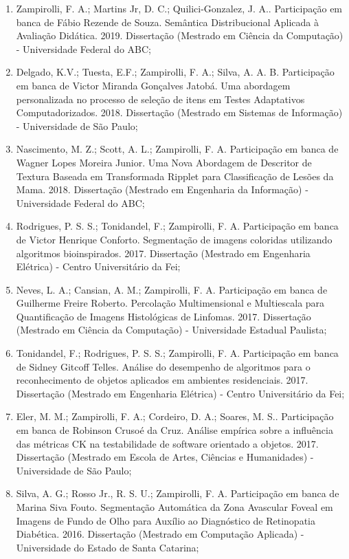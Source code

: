 \begin{enumerate}
    \item Zampirolli, F. A.; Martins Jr, D. C.; Quilici-Gonzalez, J. A.. Participação em banca de Fábio Rezende de Souza. Semântica Distribucional Aplicada à Avaliação Didática. 2019. Dissertação (Mestrado em Ciência da Computação) - Universidade Federal do ABC;
    \item Delgado, K.V.; Tuesta, E.F.; Zampirolli, F. A.; Silva, A. A. B. Participação em banca de Victor Miranda Gonçalves Jatobá. Uma abordagem personalizada no processo de seleção de itens em Testes Adaptativos Computadorizados. 2018. Dissertação (Mestrado em Sistemas de Informação) - Universidade de São Paulo;
    \item Nascimento, M. Z.; Scott, A. L.;  Zampirolli, F. A. Participação em banca de Wagner Lopes Moreira Junior. Uma Nova Abordagem de Descritor de Textura Baseada em Transformada Ripplet para Classificação de Lesões da Mama. 2018. Dissertação (Mestrado em Engenharia da Informação) - Universidade Federal do ABC;
    \item Rodrigues, P. S. S.; Tonidandel, F.; Zampirolli, F. A. Participação em banca de Victor Henrique Conforto. Segmentação de imagens coloridas utilizando algoritmos bioinspirados. 2017. Dissertação (Mestrado em Engenharia Elétrica) - Centro Universitário da Fei;
    \item Neves, L. A.; Cansian, A. M.; Zampirolli, F. A. Participação em banca de Guilherme Freire Roberto. Percolação Multimensional e Multiescala para Quantificação de Imagens Histológicas de Linfomas. 2017. Dissertação (Mestrado em Ciência da Computação) - Universidade Estadual Paulista;
    \item Tonidandel, F.; Rodrigues, P. S. S.; Zampirolli, F. A. Participação em banca de Sidney Gitcoff Telles. Análise do desempenho de algoritmos para o reconhecimento de objetos aplicados em ambientes residenciais. 2017. Dissertação (Mestrado em Engenharia Elétrica) - Centro Universitário da Fei;
    \item Eler, M. M.; Zampirolli, F. A.; Cordeiro, D. A.; Soares, M. S.. Participação em banca de Robinson Crusoé da Cruz. Análise empírica sobre a influência das métricas CK na testabilidade de software orientado a objetos. 2017. Dissertação (Mestrado em Escola de Artes, Ciências e Humanidades) - Universidade de São Paulo;
    \item Silva, A. G.; Rosso Jr., R. S. U.; Zampirolli, F. A. Participação em banca de Marina Siva Fouto. Segmentação Automática da Zona Avascular Foveal em Imagens de Fundo de Olho para Auxílio ao Diagnóstico de Retinopatia Diabética. 2016. Dissertação (Mestrado em Computação Aplicada) - Universidade do Estado de Santa Catarina;

\end{enumerate}

